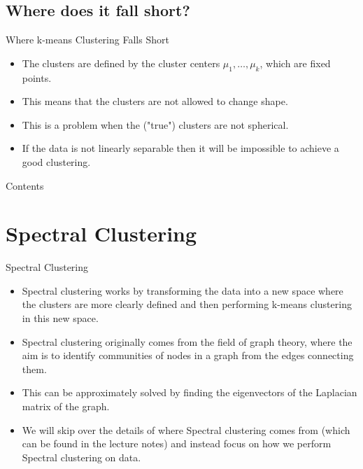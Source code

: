 \documentclass[aspectratio=169]{beamer}
\begin{document}
\subsection{Where does it fall short?}
\begin{frame}{Where k-means Clustering Falls Short}
  \begin{itemize}
    \item The clusters are defined by the cluster centers $\mu_{1},\ldots,\mu_{k}$, which are fixed points.
    \item This means that the clusters are not allowed to change shape.
    \item This is a problem when the ("true") clusters are not spherical.
    \item If the data is not linearly separable then it will be impossible to achieve a good clustering.
  \end{itemize}
\end{frame}

\begin{frame}{Contents}
  \tableofcontents
\end{frame}
\section{Spectral Clustering}
\begin{frame}{Spectral Clustering}
  \begin{itemize}
    \item Spectral clustering works by transforming the data into a new space where the clusters are more clearly defined and then performing k-means clustering in this new space. 
    \item Spectral clustering originally comes from the field of graph theory, where the aim is to identify communities of nodes in a graph from the edges connecting them.
    \item This can be approximately solved by finding the eigenvectors of the Laplacian matrix of the graph.
    \item We will skip over the details of where Spectral clustering comes from (which can be found in the lecture notes) and instead focus on how we perform Spectral clustering on data.
  \end{itemize}
\end{frame}
\end{document}
